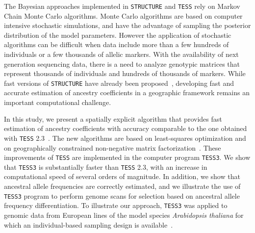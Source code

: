 The Bayesian approaches implemented in {\tt STRUCTURE} and {\tt TESS} rely on Markov Chain Monte Carlo algorithms. Monte Carlo algorithms are based on computer intensive stochastic simulations, and have the advantage of sampling the posterior distribution of the model parameters. However the application of stochastic algorithms can be difficult when data include more than a few hundreds of individuals or a few thousands of allelic markers. With the availability of next generation sequencing data, there is a need to analyze genotypic matrices that represent thousands of individuals and hundreds of thousands of markers. While fast versions of {\tt STRUCTURE} have already been proposed~\citep{raj2014faststructure, frichot2014fast, alexander2011linking, wollstein2015detecting}, developing fast and accurate estimation of ancestry coefficients in a geographic framework remains an important computational challenge.

In this study, we present a spatially explicit algorithm that provides fast estimation of ancestry coefficients with accuracy comparable to the one obtained with {\tt TESS} 2.3~\citep{durand2009spatial}. The new algorithms are based on least-squares optimization and on geographically constrained non-negative matrix factorization~\citep{cai2011graph,frichot2014fast}. These improvements of {\tt TESS} are implemented in the computer program {\tt TESS3}. We show that {\tt TESS3} is substantially faster than {\tt TESS} 2.3, with an increase in computational speed of several orders of magnitude. In addition, we show that ancestral allele frequencies are correctly estimated, and we illustrate the use of {\tt TESS3} program to perform genome scans for selection based on ancestral allele frequency differentiation. To illustrate our approach, {\tt TESS3} was applied to genomic data from European lines of the model species {\it Arabidopsis thaliana} for which an individual-based sampling design is available~\citep{atwell2010genome}.




















